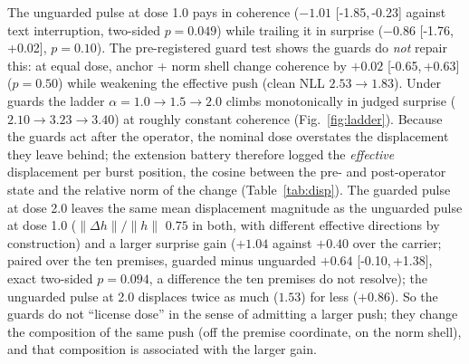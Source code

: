 \documentclass[11pt]{article}
\newcommand{\ci}[2]{[#1,\,#2]}
\begin{document}
The unguarded pulse at dose 1.0 pays in coherence ($-1.01$
\ci{-1.85}{-0.23} against text interruption, two-sided $p=0.049$)
while trailing it in surprise ($-0.86$ \ci{-1.76}{+0.02},
$p=0.10$). The pre-registered guard test
shows the guards do \emph{not} repair this: at equal dose, anchor +
norm shell change coherence by $+0.02$ \ci{-0.65}{+0.63} ($p=0.50$)
while weakening the effective push (clean NLL $2.53 \to 1.83$). Under guards the
ladder $\alpha = 1.0 \to 1.5 \to 2.0$ climbs monotonically in judged
surprise ($2.10 \to 3.23 \to 3.40$) at roughly constant coherence
(Fig.~\ref{fig:ladder}). Because the guards act after the operator,
the nominal dose overstates the displacement they leave behind; the
extension battery therefore logged the \emph{effective} displacement
per burst position, the cosine between the pre- and post-operator
state and the relative norm of the change (Table~\ref{tab:disp}). The
guarded pulse at dose 2.0 leaves the same mean displacement magnitude
as the unguarded pulse at dose 1.0 ($\lVert\Delta h\rVert/\lVert
h\rVert$ $0.75$ in both, with different effective directions by
construction) and a larger surprise gain ($+1.04$ against $+0.40$ over
the carrier; paired over the ten premises, guarded minus unguarded
$+0.64$ \ci{-0.10}{+1.38}, exact two-sided $p=0.094$, a difference
the ten premises do not resolve); the unguarded pulse at 2.0 displaces
twice as much ($1.53$) for less ($+0.86$). So the guards do not
``license dose'' in the sense of admitting a larger push; they change
the composition of the same push (off the premise coordinate, on the
norm shell), and that composition is associated with the larger gain.

\begin{table}[t]
\centering\small
{}
\caption{\textbf{Effective displacement and its yield.} Means over
fired positions and ten premises (extension battery, PyTorch bf16);
surprise contrasts paired against the habituated carrier, exact
two-sided sign-flip.}
\label{tab:disp}
\end{table}
\end{document}
